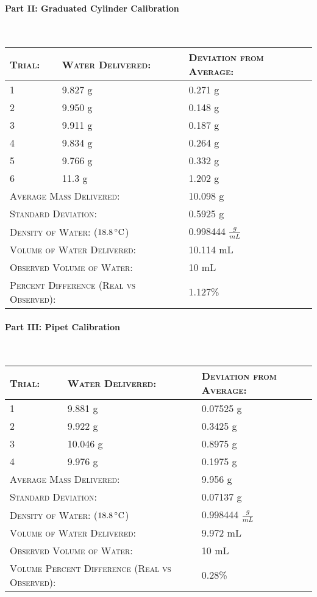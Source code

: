 \documentclass[11pt,letterpaper]{report}
\begin{document}
\paragraph{Part II: Graduated Cylinder Calibration}\mbox{}\\
\begin{tabularx}{\textwidth}{ | X| X| X|}
\hline
\textsc{Trial:} & \textsc{Water Delivered:} & \textsc{Deviation from Average:} \\
\hline
1 & 9.827 g & 0.271 g\\
2 & 9.950 g & 0.148 g\\
3 & 9.911 g & 0.187 g\\
4 & 9.834 g & 0.264 g\\
5 & 9.766 g & 0.332 g\\
6 & 11.3 g & 1.202 g\\
\hline
\multicolumn{2}{|l|}{\textsc{Average Mass Delivered:}} & 10.098 g \\
\hline
\multicolumn{2}{|l|}{\textsc{Standard Deviation:}} & 0.5925 g \\
\hline
\multicolumn{2}{|l|}{\textsc{Density of Water: ($18.8\,^{\circ}{\rm C}$)}} & 0.998444 $\frac{g}{mL}$ \\
\hline
\multicolumn{2}{|l|}{\textsc{Volume of Water Delivered:}} & 10.114 mL \\
\hline
\multicolumn{2}{|l|}{\textsc{Observed Volume of Water:}} & 10 mL \\
\hline
\multicolumn{2}{|l|}{\textsc{Percent Difference (Real vs Observed):}} & 1.127\% \\
\hline
\end{tabularx}

\paragraph{Part III: Pipet Calibration}\mbox{}\\
\begin{tabularx}{\textwidth}{ | X| X| X|}
\hline
\textsc{Trial:} & \textsc{Water Delivered:} & \textsc{Deviation from Average:} \\
\hline
1 & 9.881 g & 0.07525 g\\
2 & 9.922 g & 0.3425 g\\
3 & 10.046 g & 0.8975 g\\
4 & 9.976 g & 0.1975 g\\
\hline
\multicolumn{2}{|l|}{\textsc{Average Mass Delivered:}} & 9.956 g \\
\hline
\multicolumn{2}{|l|}{\textsc{Standard Deviation:}} & 0.07137 g \\
\hline
\multicolumn{2}{|l|}{\textsc{Density of Water: ($18.8\,^{\circ}{\rm C}$)}} & 0.998444 $\frac{g}{mL}$ \\
\hline
\multicolumn{2}{|l|}{\textsc{Volume of Water Delivered:}} & 9.972 mL\\
\hline
\multicolumn{2}{|l|}{\textsc{Observed Volume of Water:}} & 10 mL \\
\hline
\multicolumn{2}{|l|}{\textsc{Volume Percent Difference (Real vs Observed):}} & 0.28\% \\
\hline
\end{tabularx}
\end{document}

